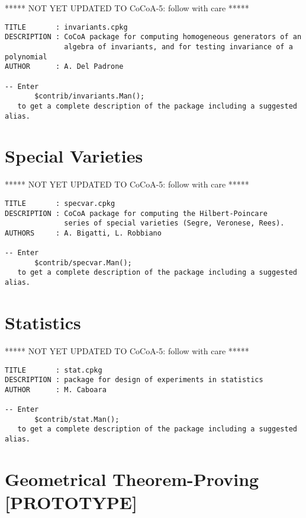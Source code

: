 \documentclass[a4paper]{mybook}
\begin{document}
        
***** NOT YET UPDATED TO CoCoA-5: follow with care *****
\par 
\begin{verbatim}
TITLE       : invariants.cpkg
DESCRIPTION : CoCoA package for computing homogeneous generators of an
              algebra of invariants, and for testing invariance of a polynomial
AUTHOR      : A. Del Padrone

-- Enter
       $contrib/invariants.Man();
   to get a complete description of the package including a suggested alias.
\end{verbatim}


\section{Special Varieties}
\label{Special Varieties}

        
***** NOT YET UPDATED TO CoCoA-5: follow with care *****
\par 
\begin{verbatim}
TITLE       : specvar.cpkg
DESCRIPTION : CoCoA package for computing the Hilbert-Poincare
              series of special varieties (Segre, Veronese, Rees).
AUTHORS     : A. Bigatti, L. Robbiano

-- Enter
       $contrib/specvar.Man();
   to get a complete description of the package including a suggested alias.
\end{verbatim}


\section{Statistics}
\label{Statistics}

        
***** NOT YET UPDATED TO CoCoA-5: follow with care *****
\par 
\begin{verbatim}
TITLE       : stat.cpkg
DESCRIPTION : package for design of experiments in statistics
AUTHOR      : M. Caboara

-- Enter
       $contrib/stat.Man();
   to get a complete description of the package including a suggested alias.
\end{verbatim}


\section{Geometrical Theorem-Proving [PROTOTYPE]}
\label{Geometrical Theorem-Proving [PROTOTYPE]}
\end{document}
